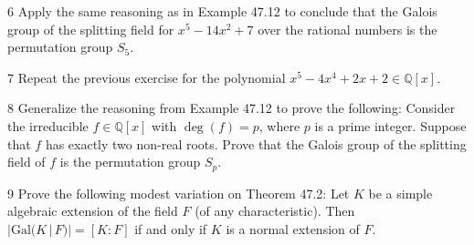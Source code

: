 \begin{problem}{6}
    Apply the same reasoning as in Example 47.12 to conclude that the Galois group of the
    splitting field for $x^5 - 14x^2 + 7$ over the rational numbers is the permutation
    group $S_5$.
\end{problem}
\unsolved

\begin{problem}{7}
    Repeat the previous exercise for the polynomial
    $x^5 - 4x^4 + 2x + 2 \in \mathbb{Q}[x]$.
\end{problem}
\unsolved

\begin{problem}{8}
    Generalize the reasoning from Example 47.12 to prove the following: Consider the
    irreducible $f \in \mathbb{Q}[x]$ with $\deg(f) = p$, where $p$ is a prime integer.
    Suppose that $f$ has exactly two non-real roots. Prove that the Galois group of the
    splitting field of $f$ is the permutation group $S_p$.
\end{problem}
\unsolved

\begin{problem}{9}
    Prove the following modest variation on Theorem 47.2: Let $K$ be a simple algebraic
    extension of the field $F$ (of any characteristic). Then
    $|\mathrm{Gal}(K \,|\, F)| = [K : F]$ if and only if $K$ is a normal extension of $F$.
\end{problem}
\unsolved
